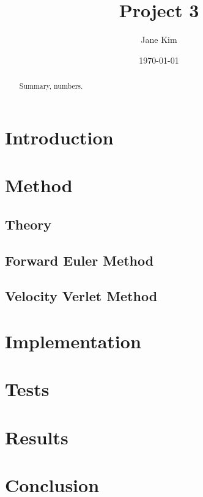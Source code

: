 \documentclass[prb,aps,twocolumn,showpacs,10pt]{revtex4-1}
\begin{document}
\title {Project 3}

\author{Jane Kim}
\date{\today}


\begin{abstract}

\vspace*{5mm}
\noindent Summary, numbers.
\end{abstract}

\maketitle

\section{Introduction}



\section{Method}

\subsection{Theory}
\subsection{Forward Euler Method}
\subsection{Velocity Verlet Method}

\section{Implementation}


\section{Tests}

\section{Results}

\section{Conclusion}
\end{document}
